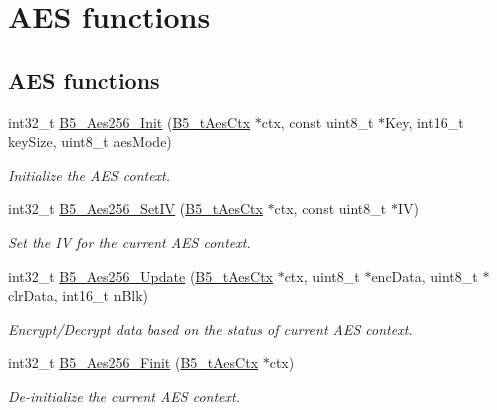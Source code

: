 \hypertarget{group__aes_func}{\section{A\-E\-S functions}
\label{group__aes_func}
}
\subsection*{A\-E\-S functions}
\begin{DoxyCompactItemize}
\item 
int32\-\_\-t \hyperlink{group__aes_func_ga53e5e4bce089a65bb66b3ba172d12804}{B5\-\_\-\-Aes256\-\_\-\-Init} (\hyperlink{struct_b5__t_aes_ctx}{B5\-\_\-t\-Aes\-Ctx} $\ast$ctx, const uint8\-\_\-t $\ast$Key, int16\-\_\-t key\-Size, uint8\-\_\-t aes\-Mode)
\begin{DoxyCompactList}\small\item\em Initialize the A\-E\-S context. \end{DoxyCompactList}\item 
int32\-\_\-t \hyperlink{group__aes_func_gac2f5c3921592486df230fec302629a41}{B5\-\_\-\-Aes256\-\_\-\-Set\-I\-V} (\hyperlink{struct_b5__t_aes_ctx}{B5\-\_\-t\-Aes\-Ctx} $\ast$ctx, const uint8\-\_\-t $\ast$I\-V)
\begin{DoxyCompactList}\small\item\em Set the I\-V for the current A\-E\-S context. \end{DoxyCompactList}\item 
int32\-\_\-t \hyperlink{group__aes_func_ga5fd1cd91caa7b0dfccb7f735d120a5e9}{B5\-\_\-\-Aes256\-\_\-\-Update} (\hyperlink{struct_b5__t_aes_ctx}{B5\-\_\-t\-Aes\-Ctx} $\ast$ctx, uint8\-\_\-t $\ast$enc\-Data, uint8\-\_\-t $\ast$clr\-Data, int16\-\_\-t n\-Blk)
\begin{DoxyCompactList}\small\item\em Encrypt/\-Decrypt data based on the status of current A\-E\-S context. \end{DoxyCompactList}\item 
int32\-\_\-t \hyperlink{group__aes_func_ga6d6ad2c832065507fd0d106f8c919623}{B5\-\_\-\-Aes256\-\_\-\-Finit} (\hyperlink{struct_b5__t_aes_ctx}{B5\-\_\-t\-Aes\-Ctx} $\ast$ctx)
\begin{DoxyCompactList}\small\item\em De-\/initialize the current A\-E\-S context. \end{DoxyCompactList}\end{DoxyCompactItemize}


